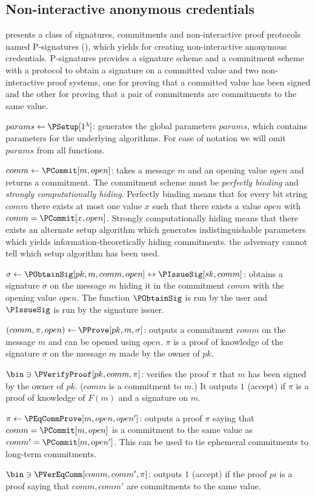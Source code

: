 \subsection{Non-interactive anonymous credentials}%
\label{NIZK-anon-cred}


 presents a class of signatures, commitments and 
non-interactive proof protocols named P-signatures (\Psig), which yields for 
creating non-interactive anonymous credentials.
P-signatures provides a signature scheme and a commitment scheme with a protocol 
to obtain a signature on a committed value and two non-interactive proof 
systems, one for proving that a committed value has been signed and the other 
for proving that a pair of commitments are commitments to the same value.


\(params\gets \PSetup[1^{\lambda}]\): generates the global parameters \(params\), 
which contains parameters for the underlying algorithms.
For ease of notation we will omit \(params\) from all functions.


\(comm\gets \PCommit[m, open]\): takes a message \(m\) and an opening value 
\(open\) and returns a commitment.
The commitment scheme must be \emph{perfectly binding} and \emph{strongly 
  computationally hiding}.
Perfectly binding means that for every bit string \(comm\) there exists at most 
one value \(x\) such that there exists a value \(open\) with \(comm = 
  \PCommit[x, open]\).
Strongly computationally hiding means that there exists an alternate setup 
algorithm which generates indistinguishable parameters which yields 
information-theoretically hiding commitments.
\Ie the adversary cannot tell which setup algorithm has been used.


\(\sigma\gets \PObtainSig[pk, m, comm, open]\leftrightarrow
  \PIssueSig[sk, comm]\): obtains a signature \(\sigma\) on the message 
\(m\) hiding it in the commitment \(comm\) with the opening value \(open\).
The function \(\PObtainSig\) is run by the user and \(\PIssueSig\) is run by the 
signature issuer.


\((comm, \pi, open)\gets \PProve[pk, m, \sigma]\): outputs a commitment 
\(comm\) on the message \(m\) and can be opened using \(open\).
\(\pi\) is a proof of knowledge of the signature \(\sigma\) on the message \(m\) 
made by the owner of \(pk\).


\(\bin\ni \PVerifyProof[pk, comm, \pi]\): verifies the proof \(\pi\) that \(m\) 
has been signed by the owner of \(pk\).
(\(comm\) is a commitment to \(m\).)
It outputs \(1\) (accept) if \(\pi\) is a proof of knowledge of \(F(m)\) and a 
signature on \(m\).


\(\pi\gets \PEqCommProve[m, open, open']\): outputs a proof \(\pi\) saying that 
\(comm = \PCommit[m, open]\) is a commitment to the same value as \(comm' = 
  \PCommit[m, open']\).
This can be used to tie ephemeral commitments to long-term commitments.


\(\bin\ni \PVerEqComm[comm, comm', \pi]\): outputs \(1\) (accept) if the proof 
\(pi\) is a proof saying that \(comm, comm'\) are commitments to the same value.
